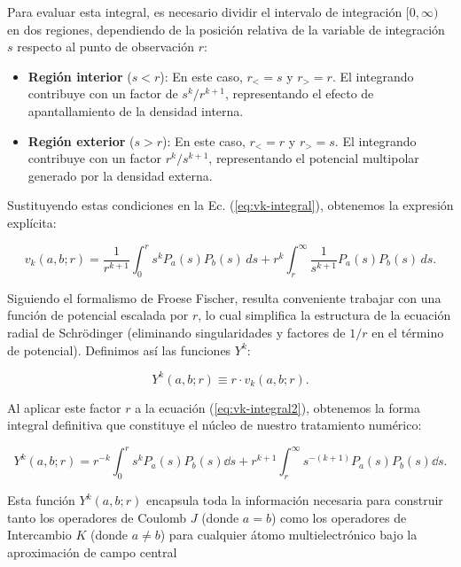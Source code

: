 Para evaluar esta integral, es necesario dividir el intervalo de integración $[0,\infty)$ en dos regiones, dependiendo de la posición relativa de la variable de integración $s$ respecto al punto de observación $r$:

\begin{itemize}
\item \textbf{Región interior} ($s < r$): En este caso, $r_< = s$ y $r_> = r$. El integrando contribuye con un factor de $s^k/r^{k+1}$, representando el efecto de apantallamiento de la densidad interna.
\item \textbf{Región exterior} ($s > r$): En este caso, $r_< = r$ y $r_> = s$. El integrando contribuye con un factor $r^k/s^{k+1}$, representando el potencial multipolar generado por la densidad externa.
\end{itemize}

Sustituyendo estas condiciones en la Ec. (\cref{eq:vk-integral}), obtenemos la expresión explícita:

\begin{equation}
 \label{eq:vk-integral2}
 v_k(a, b; r) = \frac{1}{r^{k+1}} \int_0^r s^k P_a(s) P_b(s) \, ds + r^k \int_r^{\infty} \frac{1}{s^{k+1}} P_a(s) P_b(s) \, ds.
\end{equation}

Siguiendo el formalismo de Froese Fischer, resulta conveniente trabajar con una función de potencial escalada por $r$, lo cual simplifica la estructura de la ecuación radial de Schrödinger (eliminando singularidades y factores de $1/r$ en el término de potencial). Definimos así las funciones $Y^k$:

\begin{equation}
 \label{eq:yk-pot}
 Y^k(a,b;r) \equiv r \cdot v_k(a,b;r).
\end{equation}

Al aplicar este factor $r$ a la ecuación (\cref{eq:vk-integral2}), obtenemos la forma integral definitiva que constituye el núcleo de nuestro tratamiento numérico:

\begin{equation}
\label{eq:Yk-final}
 Y^k(a,b;r) = r^{-k}\int_0^r s^kP_a(s)P_b(s) \dd{s} + r^{k+1} \int_r^{\infty} s^{-(k+1)}P_a(s)P_b(s)\dd{s}.
\end{equation}

Esta función $Y^k(a,b;r)$ encapsula toda la información necesaria para construir tanto los operadores de Coulomb $J$ (donde $a=b$) como los operadores de Intercambio $K$ (donde $a \neq b$) para cualquier átomo multielectrónico bajo la aproximación de campo central

